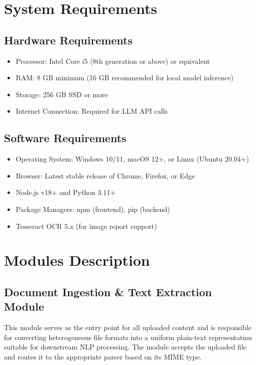 \documentclass[12pt,a4paper]{report}
\begin{document}
\section{System Requirements}

\subsection{Hardware Requirements}
\begin{itemize}
    \item Processor: Intel Core i5 (8th generation or above) or equivalent
    \item RAM: 8 GB minimum (16 GB recommended for local model inference)
    \item Storage: 256 GB SSD or more
    \item Internet Connection: Required for LLM API calls
\end{itemize}

\subsection{Software Requirements}
\begin{itemize}
    \item Operating System: Windows 10/11, macOS 12+, or Linux (Ubuntu 20.04+)
    \item Browser: Latest stable release of Chrome, Firefox, or Edge
    \item Node.js v18+ and Python 3.11+
    \item Package Managers: npm (frontend), pip (backend)
    \item Tesseract OCR 5.x (for image report support)
\end{itemize}

\section{Modules Description}

\subsection{Document Ingestion \& Text Extraction Module}
This module serves as the entry point for all uploaded content and is responsible for converting heterogeneous file formats into a uniform plain-text representation suitable for downstream NLP processing. The module accepts the uploaded file and routes it to the appropriate parser based on its MIME type.
\end{document}
